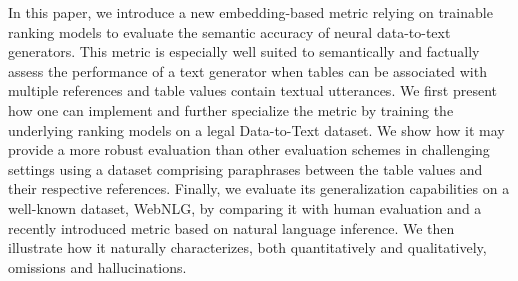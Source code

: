 In this paper, we introduce a new embedding-based metric relying on trainable ranking models to evaluate the semantic accuracy of neural data-to-text generators. This metric is especially well suited to semantically and factually assess the performance of a text generator when tables can be associated with multiple references and table values contain textual utterances. We first present how one can implement and further specialize the metric by training the underlying ranking models on a legal Data-to-Text dataset. We show how it may provide a more robust evaluation than other evaluation schemes in challenging settings using a dataset comprising paraphrases between the table values and their respective references. Finally, we evaluate its generalization capabilities on a well-known dataset, WebNLG, by comparing it with human evaluation and a recently introduced metric based on natural language inference. We then illustrate how it naturally characterizes, both quantitatively and qualitatively, omissions and hallucinations.
